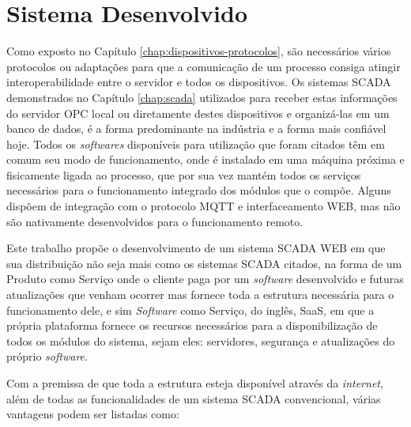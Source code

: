 \chapter{Sistema Desenvolvido}
\label{chap:sistema-desenvolvido}

Como exposto no Capítulo \ref{chap:dispositivos-protocolos}, são necessários vários protocolos ou adaptações para que a comunicação de um processo consiga atingir interoperabilidade entre o servidor e todos os dispositivos. Os sistemas \gls{SCADA} demonstrados no Capítulo \ref{chap:scada} utilizados para receber estas informações do servidor \gls{OPC} local ou diretamente destes dispositivos e organizá-las em um banco de dados, é a forma predominante na indústria e a forma mais confiável hoje. Todos os \textit{softwares} disponíveis para utilização que foram citados têm em comum seu modo de funcionamento, onde é instalado em uma máquina próxima e fisicamente ligada ao processo, que por sua vez mantém todos os serviços necessários para o funcionamento integrado dos módulos que o compõe. Alguns dispõem de integração com o protocolo \gls{MQTT} e interfaceamento \gls{WEB}, mas não são nativamente desenvolvidos para o funcionamento remoto.

Este trabalho propõe o desenvolvimento de um sistema \gls{SCADA} \gls{WEB} em que sua distribuição não seja mais como os sistemas \gls{SCADA} citados, na forma de um Produto como Serviço onde o cliente paga por um \textit{software} desenvolvido e futuras atualizações que venham ocorrer mas fornece toda a estrutura necessária para o funcionamento dele, e sim \textit{Software} como Serviço, do inglês, \gls{SaaS}, em que a própria plataforma fornece os recursos necessários para a disponibilização de todos os módulos do sistema, sejam eles: servidores, segurança e atualizações do próprio \textit{software}.

Com a premissa de que toda a estrutura esteja disponível através da \textit{internet}, além de todas as funcionalidades de um sistema \gls{SCADA} convencional, várias vantagens podem ser listadas como:

